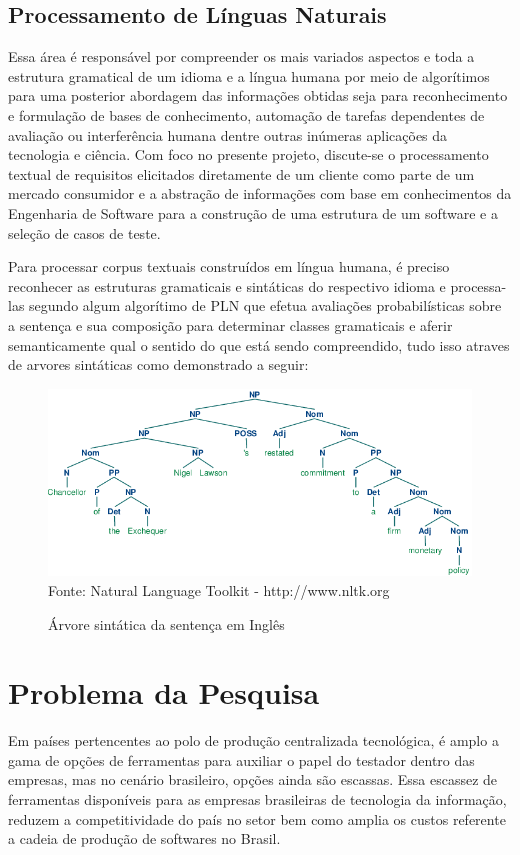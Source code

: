 \subsection{Processamento de Línguas Naturais}
Essa área é responsável por compreender os mais variados aspectos e toda a estrutura gramatical de um idioma e a língua humana por meio de algorítimos para uma posterior abordagem das informações obtidas seja para reconhecimento e formulação de bases de conhecimento, automação de tarefas dependentes de avaliação ou interferência humana dentre outras inúmeras aplicações da tecnologia e ciência.
Com foco no presente projeto, discute-se o processamento textual de requisitos elicitados diretamente de um cliente como parte de um mercado consumidor e a abstração de informações com base em conhecimentos da Engenharia de Software para a construção de uma estrutura de um software e a seleção de casos de teste.

Para processar corpus textuais construídos em língua humana, é preciso reconhecer as estruturas gramaticais e sintáticas do respectivo idioma e processa-las segundo algum algorítimo de PLN que efetua avaliações probabilísticas sobre a sentença e sua composição para determinar classes gramaticais e aferir semanticamente qual o sentido do que está sendo compreendido, tudo isso atraves de arvores sintáticas como demonstrado a seguir:

\begin{figure}[!htb][H]
\centering
\caption{Árvore sintática da sentença em Inglês} %
\includegraphics[scale=0.5]{01}\\  %
{\small Fonte: Natural Language Toolkit - http://www.nltk.org} %
\label{fig:exemplo} %
\end{figure}

\section{Problema da Pesquisa}
Em países pertencentes ao polo de produção centralizada tecnológica, é amplo a gama de opções de ferramentas para auxiliar o papel do testador dentro das empresas, mas no cenário brasileiro, opções ainda são escassas. Essa escassez de ferramentas disponíveis para as empresas brasileiras de tecnologia da informação, reduzem a competitividade do país no setor bem como amplia os custos referente a cadeia de produção de softwares no Brasil.

